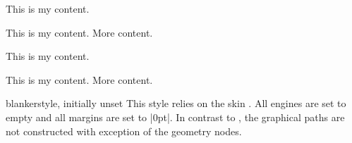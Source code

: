 \begin{dispExample}
\begin{tcbraster}[empty,raster equal height,raster columns=4,
    coltitle=Navy,borderline={2pt}{0pt}{black!10!white},
    left=1mm,right=1mm,top=1mm,bottom=1mm,middle=1mm]
  \begin{tcolorbox}
    This is my content.
  \end{tcolorbox}
  \begin{tcolorbox}
    This is my content.
    \tcblower
    More content.
  \end{tcolorbox}
  \begin{tcolorbox}[adjusted title=My title]
    This is my content.
  \end{tcolorbox}
  \begin{tcolorbox}[adjusted title=My title]
    This is my content.
    \tcblower
    More content.
  \end{tcolorbox}
\end{tcbraster}
\end{dispExample}


\clearpage
\begin{docTcbKey}{blanker}{}{style, initially unset}
  This style relies on the skin . All engines
  are set to empty and all margins are set to |0pt|.
  In contrast to , the graphical paths are
  not constructed with exception of the geometry nodes.
\begin{dispExample}
\begin{tcolorbox}[blanker,watermark text=A blank box]
\lipsum[1]
\end{tcolorbox}
\end{dispExample}

\end{docTcbKey}



